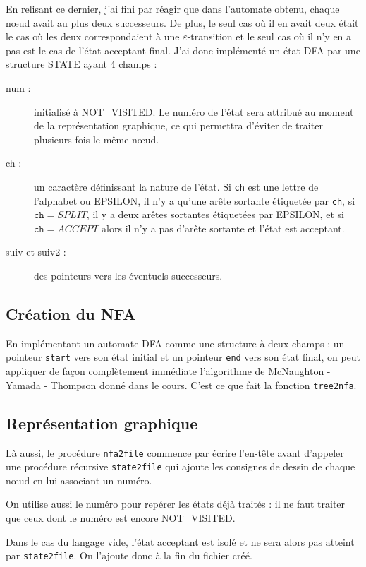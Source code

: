 \documentclass[12pt, a4paper]{article}
\begin{document}
En relisant ce dernier, j'ai fini par réagir que dans l'automate obtenu, chaque nœud avait au plus deux successeurs. De plus, le seul cas où il en avait deux était le cas où les deux correspondaient à une $\varepsilon$-transition et le seul cas où il n'y en a pas est le cas de l'état acceptant final. J'ai donc implémenté un état DFA par une structure STATE ayant 4 champs :
\begin{description}
\item[num :] initialisé à NOT\_VISITED. Le numéro de l'état sera attribué au moment de la représentation graphique, ce qui permettra d'éviter de traiter plusieurs fois le même nœud.
\item[ch :] un caractère définissant la nature de l'état. Si \texttt{ch} est une lettre de l'alphabet ou EPSILON, il n'y a qu'une arête sortante étiquetée par \texttt{ch}, si $\texttt{ch}=SPLIT$, il y a deux arêtes sortantes étiquetées par EPSILON, et si $\texttt{ch}=ACCEPT$ alors il n'y a pas d'arête sortante et l'état est acceptant.
\item[suiv et suiv2 : ] des pointeurs vers les éventuels successeurs.
\end{description}

\subsection{Création du NFA}

En implémentant un automate DFA comme une structure à deux champs : un pointeur \texttt{start} vers son état initial et un pointeur \texttt{end} vers son état final, on peut appliquer de façon complètement immédiate l'algorithme de McNaughton - Yamada - Thompson donné dans le cours. C'est ce que fait la fonction \texttt{tree2nfa}.

\subsection{Représentation graphique}

Là aussi, le procédure \texttt{nfa2file} commence par écrire l'en-tête avant d'appeler une procédure récursive \texttt{state2file} qui ajoute les consignes de dessin de chaque nœud en lui associant un numéro.

On utilise aussi le numéro pour repérer les états déjà traités : il ne faut traiter que ceux dont le numéro est encore NOT\_VISITED.

Dans le cas du langage vide, l'état acceptant est isolé et ne sera alors pas atteint par \texttt{state2file}. On l'ajoute donc à la fin du fichier créé.
\end{document}
